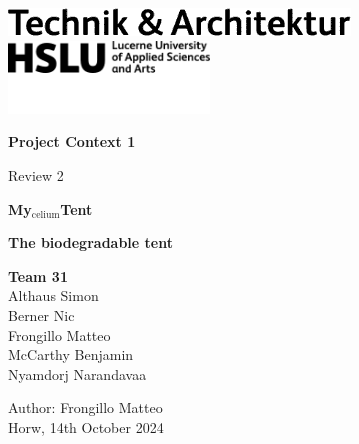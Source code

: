 \documentclass{article}
\begin{document}
\begin{titlepage}
    \begin{flushleft}
        \includegraphics[width=.3\textwidth]{media/hslu-logo-2.png}\\
        \hspace*{.16cm}\includegraphics[width=0.4\textwidth]{media/hslu-svg-logo.png}
    \end{flushleft}

    \vspace*{-.4cm}
    {\huge \textbf{Project Context 1}}

    {\Large Review 2}

    \vspace*{3cm}
    \begin{center}
        {\Huge \textbf{My$_{\text{celium}}$Tent}}

        \vspace*{.1cm}
        \textbf{\large The biodegradable tent}

    \end{center}

    \vfill
    {\Large \textbf{Team 31}}\\
    {\large \vspace*{.01cm}
        Althaus Simon\\
        \vspace*{.01cm}
        Berner Nic\\
        \vspace*{.01cm}   
        Frongillo Matteo\\
        \vspace*{.01cm}
        McCarthy Benjamin\\
        \vspace*{.01cm}
        Nyamdorj Narandavaa\\
        \vspace*{.01cm}
    }
    
    \vspace{.75cm}
    {\large
    Author: Frongillo Matteo\\
    Horw, 14th October 2024
    }
\end{titlepage}
\end{document}
